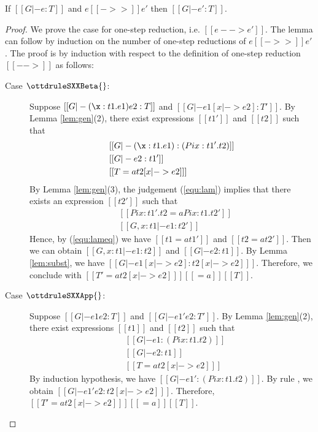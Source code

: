 \begin{lem}
If $[[G |- e:T]]$ and $e [[->>]] e'$ then $[[G |- e':T]]$.
\end{lem}

\begin{proof}
    We prove the case for one-step reduction, i.e. $[[e --> e']]$. The lemma can follow by induction on the number of one-step reductions of $e [[->>]] e'$.
    The proof is by induction with respect to the definition of one-step reduction $[[-->]]$ as follows:
    \begin{description}
        \item[Case $\ottdruleSXXBeta{}$:] $\quad$ \\
        Suppose $[[G |- (\x:t1.e1)e2 :T]]$ and $[[G |- e1 [x |-> e2] :T']]$. By Lemma \ref{lem:gen}(2), there exist expressions $[[t1']]$ and $[[t2]]$ such that 
        \begin{align}
            &[[G |- (\x:t1.e1):(Pi x:t1'.t2)]] \label{equ:lam} \\
            &[[G |- e2:t1']] \nonumber \\
            &[[T =a t2 [x |-> e2] ]] \nonumber
        \end{align}
        By Lemma \ref{lem:gen}(3), the judgement (\ref{equ:lam}) implies that there exists an expression $[[t2']]$ such that
        \begin{align}
            &[[Pi x:t1'.t2 =a Pi x:t1.t2']] \label{equ:lameq}\\
            &[[G, x:t1 |- e1:t2']] \nonumber
        \end{align}
        Hence, by (\ref{equ:lameq}) we have $[[t1 =a t1']]$ and $[[t2 =a t2']]$. Then we can obtain $[[G, x:t1 |- e1:t2]]$ and $[[G |- e2:t1]]$. By Lemma \ref{lem:subst}, we have $[[G |- e1[x |-> e2] : t2[x |-> e2] ]]$. Therefore, we conclude with $[[T' =a t2[x |-> e2] ]] [[=a]] [[T]]$.
        
        \item[Case $\ottdruleSXXApp{}$:] $\quad$ \\
        Suppose $[[G |- e1 e2 :T]]$ and $[[G |- e1' e2 :T']]$. By Lemma \ref{lem:gen}(2), there exist expressions $[[t1]]$ and $[[t2]]$ such that 
        \begin{align*}
            &[[G |- e1:(Pi x:t1.t2)]] \\
            &[[G |- e2:t1]]\\
            &[[T =a t2 [x |-> e2] ]]
        \end{align*}
        By induction hypothesis, we have $[[G |- e1':(Pi x:t1.t2)]]$. By rule , we obtain $[[G |- e1' e2 : t2[x |-> e2] ]]$. Therefore, $[[T' =a t2[x |-> e2] ]] [[=a]] [[T]]$.
        

\end{description}
\end{proof}
